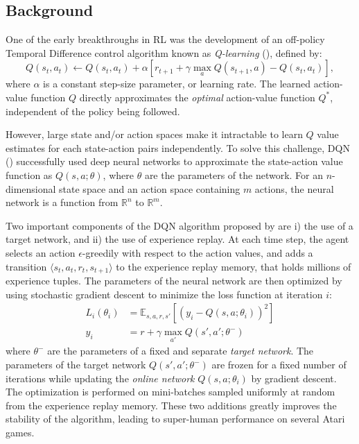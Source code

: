 \documentclass{article}
\begin{document}
    \subsection{Background}
    \label{subsec:background}
    One of the early breakthroughs in RL was the development of an off-policy Temporal Difference control algorithm known as \emph{Q-learning} (\cite{qlearning}), defined by:
    \begin{equation}
        Q(s_{t}, a_{t}) \leftarrow Q(s_{t}, a_{t}) + \alpha \left[ r_{t+1} + \gamma \max_{a} Q(s_{t+1}, a) - Q(s_{t}, a_{t}) \right],
    \end{equation}
    where $\alpha$ is a constant step-size parameter, or learning rate.
    The learned action-value function $Q$ directly approximates the \emph{optimal} action-value function $Q^{*}$, independent of the policy being followed.

    However, large state and/or action spaces make it intractable to learn $Q$ value estimates for each state-action pairs independently.
    To solve this challenge, DQN (\cite{dqn}) successfully used deep neural networks to approximate the state-action value function as $Q(s, a; \theta)$, where $\theta$ are the parameters of the network.
    For an $n$-dimensional state space and an action space containing $m$ actions, the neural network is a function from $\mathbb{R}^{n}$ to $\mathbb{R}^{m}$.

    Two important components of the DQN algorithm proposed by \cite{dqn} are i) the use of a target network, and ii) the use of experience replay.
    At each time step, the agent selects an action $\epsilon$-greedily with respect to the action values, and adds a transition $\langle s_{t}, a_{t}, r_{t}, s_{t+1} \rangle$ to the experience replay memory, that holds millions of experience tuples.
    The parameters of the neural network are then optimized by using stochastic gradient descent to minimize the loss function at iteration $i$:
    \begin{align}
        L_{i}(\theta_{i}) &= \mathbb{E}_{s, a, r, s'} \left[ \left( y_{i} - Q(s, a; \theta_{i}) \right)^2 \right] \\
        y_{i} &= r + \gamma \max_{a'}Q(s', a'; \theta^{-})
    \end{align}
    where $\theta^{-}$ are the parameters of a fixed and separate \emph{target network}.
    The parameters of the target network $Q(s', a'; \theta^{-})$ are frozen for a fixed number of iterations while updating the \emph{online network} $Q(s, a; \theta_{i})$ by gradient descent.
    The optimization is performed on mini-batches sampled uniformly at random from the experience replay memory.
    These two additions greatly improves the stability of the algorithm, leading to super-human performance on several Atari games.
\end{document}
